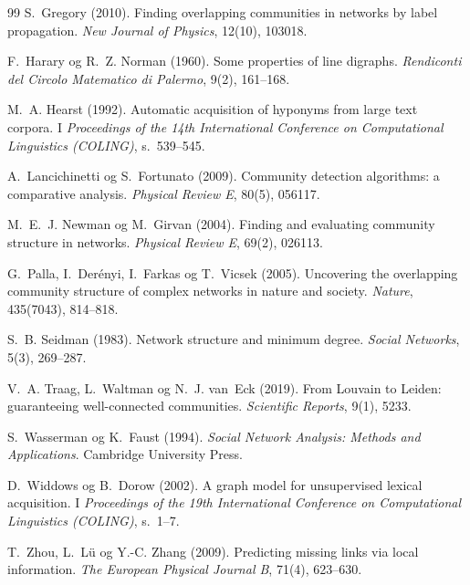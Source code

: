 \documentclass[11pt,a4paper]{article}
\begin{document}
\begin{thebibliography}{99}
S.~Gregory (2010).
\newblock Finding overlapping communities in networks by label propagation.
\newblock \emph{New Journal of Physics}, 12(10), 103018.

F.~Harary og R.~Z. Norman (1960).
\newblock Some properties of line digraphs.
\newblock \emph{Rendiconti del Circolo Matematico di Palermo}, 9(2), 161--168.

M.~A. Hearst (1992).
\newblock Automatic acquisition of hyponyms from large text corpora.
\newblock I \emph{Proceedings of the 14th International Conference on Computational Linguistics (COLING)}, s.~539--545.

A.~Lancichinetti og S.~Fortunato (2009).
\newblock Community detection algorithms: a comparative analysis.
\newblock \emph{Physical Review E}, 80(5), 056117.

M.~E.~J. Newman og M.~Girvan (2004).
\newblock Finding and evaluating community structure in networks.
\newblock \emph{Physical Review E}, 69(2), 026113.

G.~Palla, I.~Der{\'e}nyi, I.~Farkas og T.~Vicsek (2005).
\newblock Uncovering the overlapping community structure of complex networks in nature and society.
\newblock \emph{Nature}, 435(7043), 814--818.

S.~B. Seidman (1983).
\newblock Network structure and minimum degree.
\newblock \emph{Social Networks}, 5(3), 269--287.

V.~A. Traag, L.~Waltman og N.~J. van~Eck (2019).
\newblock From Louvain to Leiden: guaranteeing well-connected communities.
\newblock \emph{Scientific Reports}, 9(1), 5233.

S.~Wasserman og K.~Faust (1994).
\newblock \emph{Social Network Analysis: Methods and Applications}.
\newblock Cambridge University Press.

D.~Widdows og B.~Dorow (2002).
\newblock A graph model for unsupervised lexical acquisition.
\newblock I \emph{Proceedings of the 19th International Conference on Computational Linguistics (COLING)}, s.~1--7.

T.~Zhou, L.~L{\"u} og Y.-C. Zhang (2009).
\newblock Predicting missing links via local information.
\newblock \emph{The European Physical Journal B}, 71(4), 623--630.

\end{thebibliography}
\end{document}
